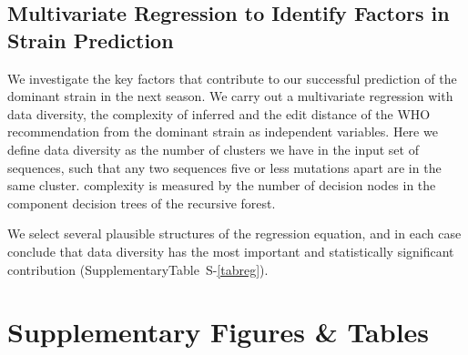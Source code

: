 \documentclass[onecolumn, compsoc,10pt]{IEEEtran}
\def\SUPPLEMENTARY{Supplementary}
\begin{document}
\subsection*{Multivariate Regression to Identify Factors in Strain Prediction}

We investigate the key factors that contribute to our successful prediction of the dominant strain in the next season. We carry out a multivariate regression with data diversity, the complexity of inferred \enet and the edit distance of the WHO recommendation from the dominant strain as independent variables. Here we define data diversity as the number of clusters we have in the input set of sequences, such that any two sequences five or less mutations apart are in the same cluster. \enet complexity is measured by the number of decision nodes in the component decision trees of the recursive forest.

We select several plausible structures of the regression equation, and in each case conclude that  data diversity has the most important and statistically significant contribution (\SUPPLEMENTARY Table~S-\ref{tabreg}).


\clearpage

\section*{Supplementary Figures \& Tables}


\end{document}
